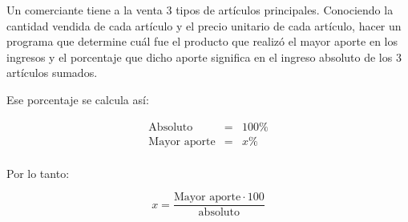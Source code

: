 Un comerciante tiene a la venta 3 tipos de artículos principales. Conociendo la cantidad vendida de cada artículo y el precio unitario de cada artículo, hacer un programa que determine cuál fue el producto que realizó el mayor aporte en los ingresos y el porcentaje que dicho aporte significa en el ingreso absoluto de los 3 artículos sumados. 

Ese porcentaje se calcula así:

\begin{eqnarray*}
\textrm{Absoluto} & = & 100\%\\
\textrm{Mayor aporte} & = & x\% \\
\end{eqnarray*}

Por lo tanto:    

\[
x = \frac{\textrm{Mayor aporte} \cdot 100}{ \textrm{absoluto}}
\]

